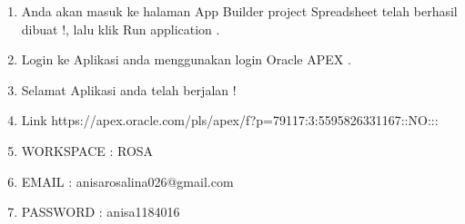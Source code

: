 \begin{enumerate}
\item Anda akan masuk ke halaman App Builder project Spreadsheet telah berhasil dibuat !, lalu klik Run application .

\item Login ke Aplikasi anda menggunakan login Oracle APEX .

\item Selamat Aplikasi anda telah berjalan ! 
\item Link https://apex.oracle.com/pls/apex/f?p=79117:3:5595826331167::NO:::
\item WORKSPACE   : ROSA
\item EMAIL       : anisarosalina026@gmail.com
\item PASSWORD    : anisa1184016



  \begin{enumerate}
   
      
  \end{enumerate}
  \end{enumerate}
